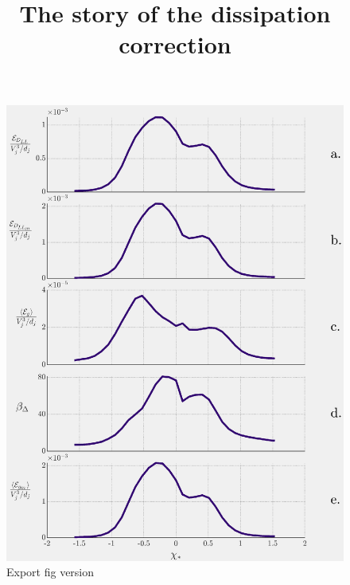 \documentclass{article}
\title{The story of the dissipation correction}
\date{}
\begin{document}
\maketitle

\begin{figure}
    \centering
    \includegraphics{figs/PG_4Hz_Diss_Splots.eps}
    \caption{Export fig version}
    \label{dissPlots1}
\end{figure}
\end{document}
